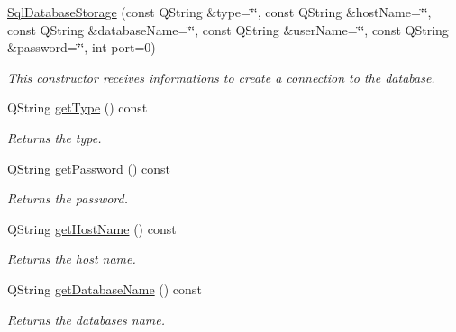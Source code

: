 \begin{DoxyCompactItemize}
\item 
\hyperlink{class_sql_database_storage_a691465c618b8050f5c67543f57fc4d15}{Sql\+Database\+Storage} (const Q\+String \&type=\char`\"{}\char`\"{}, const Q\+String \&host\+Name=\char`\"{}\char`\"{}, const Q\+String \&database\+Name=\char`\"{}\char`\"{}, const Q\+String \&user\+Name=\char`\"{}\char`\"{}, const Q\+String \&password=\char`\"{}\char`\"{}, int port=0)
\begin{DoxyCompactList}\small\item\em This constructor receives informations to create a connection to the database. \end{DoxyCompactList}\item 
\mbox{\label{class_sql_database_storage_af63f84ae9263c490325f10bbb352c983}} 
Q\+String \hyperlink{class_sql_database_storage_af63f84ae9263c490325f10bbb352c983}{get\+Type} () const
\begin{DoxyCompactList}\small\item\em Returns the type. \end{DoxyCompactList}\item 
\mbox{\label{class_sql_database_storage_a1f87803a1217305b4bc05fd13bf36ba6}} 
Q\+String \hyperlink{class_sql_database_storage_a1f87803a1217305b4bc05fd13bf36ba6}{get\+Password} () const
\begin{DoxyCompactList}\small\item\em Returns the password. \end{DoxyCompactList}\item 
\mbox{\label{class_sql_database_storage_a23a969c1fd094a15b1787add541e9bb5}} 
Q\+String \hyperlink{class_sql_database_storage_a23a969c1fd094a15b1787add541e9bb5}{get\+Host\+Name} () const
\begin{DoxyCompactList}\small\item\em Returns the host name. \end{DoxyCompactList}\item 
\mbox{\label{class_sql_database_storage_a69dd2e9296bc727fa396316d1746dee8}} 
Q\+String \hyperlink{class_sql_database_storage_a69dd2e9296bc727fa396316d1746dee8}{get\+Database\+Name} () const
\begin{DoxyCompactList}\small\item\em Returns the database\textquotesingle{}s name. \end{DoxyCompactList}\item 

\end{DoxyCompactItemize}
